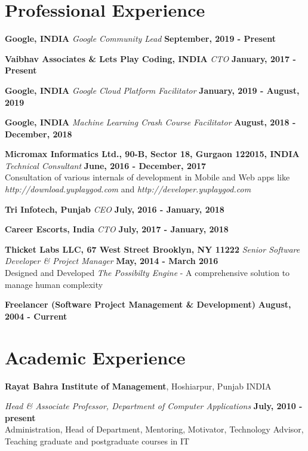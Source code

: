 \documentclass[margin,line]{res}
\begin{document}
\begin{resume}
\section{\sc Professional Experience}

%
%

{\bf Google, INDIA}
{\em Google Community Lead} \hfill {\bf September, 2019 - Present}

{\bf Vaibhav Associates \& Lets Play Coding, INDIA}
{\em CTO} \hfill {\bf January, 2017 - Present}

{\bf Google, INDIA}
{\em Google Cloud Platform Facilitator} \hfill {\bf January, 2019 - August, 2019}

{\bf Google, INDIA}
{\em Machine Learning Crash Course Facilitator} \hfill {\bf August, 2018 - December, 2018}

{\bf Micromax Informatics Ltd., 90-B, Sector 18, Gurgaon 122015, INDIA}
{\em Technical Consultant} \hfill {\bf June, 2016 - December, 2017}\\
Consultation of various internals of development in Mobile and Web apps like {\em http://download.yuplaygod.com} and {\em http://developer.yuplaygod.com}

{\bf Tri Infotech, Punjab}
{\em CEO} \hfill {\bf July, 2016 - January, 2018}

{\bf Career Escorts, India}
{\em CTO} \hfill {\bf July, 2017 - January, 2018}

{\bf Thicket Labs LLC, 67 West Street Brooklyn, NY 11222}
{\em Senior Software Developer \& Project Manager} \hfill {\bf May, 2014 - March 2016}\\
Designed and Developed {\em The Possibilty Engine} - A comprehensive solution to manage human complexity

{\bf Freelancer (Software Project Management \& Development)} \hfill {\bf August, 2004 - Current}

\section{\sc Academic Experience}
{\bf Rayat Bahra Institute of Management}, Hoshiarpur, Punjab INDIA

\vspace{-.3cm}
{\em Head \& Associate Professor, Department of Computer Applications} \hfill {\bf July, 2010 - present}\\
Administration, Head of Department, Mentoring, Motivator, Technology Advisor, Teaching graduate and postgraduate courses in IT


\end{resume}
\end{document}
